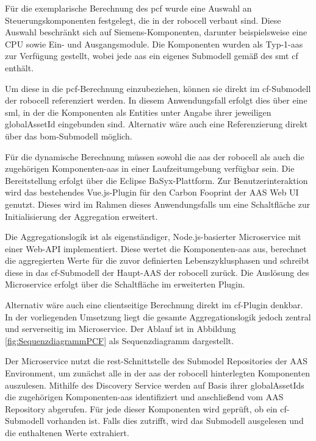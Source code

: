 Für die exemplarische Berechnung des \acs{pcf} wurde eine Auswahl an Steuerungskomponenten festgelegt, die in der robocell verbaut sind.  
Diese Auswahl beschränkt sich auf Siemens-Komponenten, darunter beispielsweise eine CPU sowie Ein- und Ausgangsmodule.  
Die Komponenten wurden als Typ-1-\acs{aas} zur Verfügung gestellt, wobei jede \acs{aas} ein eigenes Submodell gemäß des \acs{smt} \acs{cf} enthält.

Um diese in die \acs{pcf}-Berechnung einzubeziehen, können sie direkt im \acs{cf}-Submodell der robocell referenziert werden. 
In diesem Anwendungsfall erfolgt dies über eine \acs{sml}, in der die Komponenten als Entities unter Angabe ihrer jeweiligen globalAssetId eingebunden sind. 
Alternativ wäre auch eine Referenzierung direkt über das \acs{bom}-Submodell möglich.

Für die dynamische Berechnung müssen sowohl die \acs{aas} der robocell als auch die zugehörigen Komponenten-\acs{aas} in einer Laufzeitumgebung verfügbar sein. 
Die Bereitstellung erfolgt über die Eclipse BaSyx-Plattform.
Zur Benutzerinteraktion wird das bestehendes Vue.js-Plugin für den Carbon Fooprint der AAS Web UI genutzt.
Dieses wird im Rahmen dieses Anwendungsfalls um eine Schaltfläche zur Initialisierung der Aggregation erweitert.

Die Aggregationslogik ist als eigenständiger, Node.js-basierter Microservice mit einer Web-API implementiert. 
Diese wertet die Komponenten-\acs{aas} aus, berechnet die aggregierten Werte für die zuvor definierten Lebenszyklusphasen und schreibt diese in das \acs{cf}-Submodell der Haupt-AAS der robocell zurück. 
Die Auslösung des Microservice erfolgt über die Schaltfläche im erweiterten Plugin.

Alternativ wäre auch eine clientseitige Berechnung direkt im \acs{cf}-Plugin denkbar. 
In der vorliegenden Umsetzung liegt die gesamte Aggregationslogik jedoch zentral und serverseitig im Microservice. 
Der Ablauf ist in Abbildung \ref{fig:SequenzdiagrammPCF} als Sequenzdiagramm dargestellt.

    

Der Microservice nutzt die \acs{rest}-Schnittstelle des Submodel Repositories der AAS Environment, um zunächst alle in der \acs{aas} der robocell hinterlegten Komponenten auszulesen. 
Mithilfe des Discovery Service werden auf Basis ihrer globalAssetIds die zugehörigen Komponenten-\acs{aas} identifiziert und anschließend vom AAS Repository abgerufen.
Für jede dieser Komponenten wird geprüft, ob ein \acs{cf}-Submodell vorhanden ist. 
Falls dies zutrifft, wird das Submodell ausgelesen und die enthaltenen Werte extrahiert.

